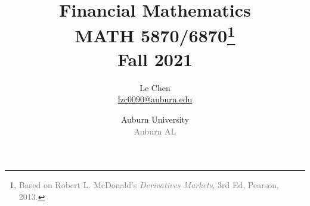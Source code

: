 


\title %
{
  Financial Mathematics \\
  \bigskip
  \small MATH 5870/6870\footnote{\textcolor{gray}{Based on Robert L. McDonald's {\it Derivatives Markets}, 3rd Ed, Pearson, 2013.}}\\
  Fall 2021
}


\author{Le Chen\\[1em]
  {\small\textcolor{gray}{\url{lzc0090@auburn.edu}}}
}



\date[Auburn]{Auburn University\\ \textcolor{gray}{Auburn AL}}



